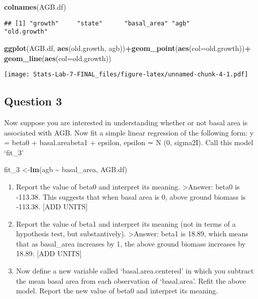 \documentclass[
]{article}
\newenvironment{Shaded}{\begin{snugshade}}{\end{snugshade}}
\newcommand{\AttributeTok}[1]{\textcolor[rgb]{0.13,0.29,0.53}{#1}}
\newcommand{\FunctionTok}[1]{\textcolor[rgb]{0.13,0.29,0.53}{\textbf{#1}}}
\newcommand{\NormalTok}[1]{#1}
\newcommand{\OtherTok}[1]{\textcolor[rgb]{0.56,0.35,0.01}{#1}}
\newcommand{\SpecialCharTok}[1]{\textcolor[rgb]{0.81,0.36,0.00}{\textbf{#1}}}
\begin{document}
\begin{Shaded}
\begin{Highlighting}[]
\FunctionTok{colnames}\NormalTok{(AGB.df)}
\end{Highlighting}
\end{Shaded}

\begin{verbatim}
## [1] "growth"     "state"      "basal_area" "agb"        "old.growth"
\end{verbatim}

\begin{Shaded}
\begin{Highlighting}[]
\FunctionTok{ggplot}\NormalTok{(AGB.df, }\FunctionTok{aes}\NormalTok{(old.growth, agb))}\SpecialCharTok{+}\FunctionTok{geom\_point}\NormalTok{(}\FunctionTok{aes}\NormalTok{(}\AttributeTok{col=}\NormalTok{old.growth))}\SpecialCharTok{+} \FunctionTok{geom\_line}\NormalTok{(}\FunctionTok{aes}\NormalTok{(}\AttributeTok{col=}\NormalTok{old.growth))}
\end{Highlighting}
\end{Shaded}

\texttt{[image: Stats-Lab-7-FINAL\_files/figure-latex/unnamed-chunk-4-1.pdf]}

\hypertarget{question-3}{%
\subsection{Question 3}\label{question-3}}

Now suppose you are interested in understanding whether or not basal
area is associated with AGB. Now fit a simple linear regression of the
following form: y = beta0 + basal.areabeta1 + epsilon, epsilon ∼ N (0,
sigma2I). Call this model `fit\_3'

\begin{Shaded}
\begin{Highlighting}[]
\NormalTok{fit\_3 }\OtherTok{\textless{}{-}}\FunctionTok{lm}\NormalTok{(agb }\SpecialCharTok{\textasciitilde{}}\NormalTok{ basal\_area, AGB.df)}
\end{Highlighting}
\end{Shaded}

\begin{enumerate}
\def\labelenumi{\alph{enumi}.}
\item
  Report the value of beta0 and interpret its meaning.
  \textgreater Answer: beta0 is -113.38. This suggests that when basal
  area is 0, above ground biomass is -113.38. {[}ADD UNITS{]}
\item
  Report the value of beta1 and interpret its meaning (not in terms of a
  hypothesis test, but substantively). \textgreater Answer: beta1 is
  18.89, which means that as basal\_area increases by 1, the above
  ground biomass increases by 18.89. {[}ADD UNITS{]}
\item
  Now define a new variable called `basal.area.centered' in which you
  subtract the mean basal area from each observation of `basal.area'.
  Refit the above model. Report the new value of beta0 and interpret its
  meaning.
\end{enumerate}
\end{document}

